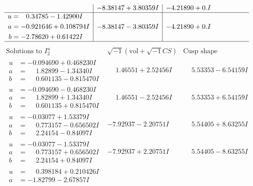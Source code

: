 \documentclass[1p]{elsarticle_modified}
\theoremstyle{definition}
\newcommand{\I}{\sqrt{-1}}
\begin{document}
$$\begin{array}{c|c|c}
 & -8.38147 + 3.80359 I & -4.21890 + 0. I\phantom{ +0.000000I} \\ \hline\begin{aligned}
u &= \phantom{-}0.34785 - 1.42900 I \\
a &= -0.921646 + 0.108794 I \\
b &= -2.78620 + 0.61422 I\end{aligned}
 & -8.38147 - 3.80359 I & -4.21890 + 0. I\phantom{ +0.000000I}\\
 \hline 
 \end{array}$$\newpage$$\begin{array}{c|c|c}  
\text{Solutions to }I^u_{2}& \I (\text{vol} + \sqrt{-1}CS) & \text{Cusp shape}\\
 \hline 
\begin{aligned}
u &= -0.094690 + 0.468230 I \\
a &= \phantom{-}1.82899 - 1.34340 I \\
b &= \phantom{-}0.601135 - 0.815470 I\end{aligned}
 & \phantom{-}1.46551 + 2.52456 I & \phantom{-}5.53353 - 6.54159 I \\ \hline\begin{aligned}
u &= -0.094690 - 0.468230 I \\
a &= \phantom{-}1.82899 + 1.34340 I \\
b &= \phantom{-}0.601135 + 0.815470 I\end{aligned}
 & \phantom{-}1.46551 - 2.52456 I & \phantom{-}5.53353 + 6.54159 I \\ \hline\begin{aligned}
u &= -0.03077 + 1.53379 I \\
a &= \phantom{-}0.773157 - 0.656502 I \\
b &= \phantom{-}2.24154 - 0.84097 I\end{aligned}
 & -7.92937 - 2.20751 I & \phantom{-}5.54405 + 8.63255 I \\ \hline\begin{aligned}
u &= -0.03077 - 1.53379 I \\
a &= \phantom{-}0.773157 + 0.656502 I \\
b &= \phantom{-}2.24154 + 0.84097 I\end{aligned}
 & -7.92937 + 2.20751 I & \phantom{-}5.54405 - 8.63255 I \\ \hline\begin{aligned}
u &= \phantom{-}0.398184 + 0.210426 I \\
a &= -1.82799 - 2.67857 I \\

\end{aligned}
\end{array}$$
\end{document}
